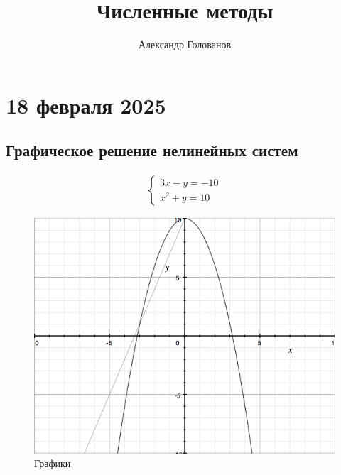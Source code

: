 \documentclass[]{article}
\title{Численные методы}
\author{Александр Голованов}
\begin{document}
\maketitle
\newpage
\tableofcontents
\newpage

\section{18 февраля 2025}
\subsection{Графическое решение нелинейных систем}

\begin{gather*}
\begin{cases}
3x-y =-10\\
x^2+y=10
\end{cases}
\end{gather*}

\begin{figure}[h]
\caption{Графики}
\centering
\includegraphics[width=\textwidth]{graph1}
\end{figure}
\end{document}
